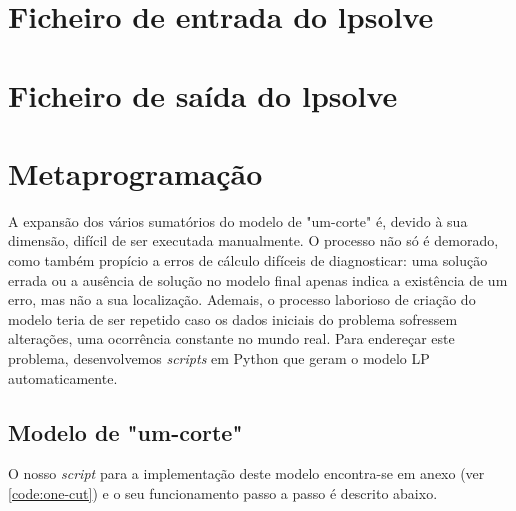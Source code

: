 \documentclass[12pt, a4paper, titlepage]{article}
\begin{document}
\section{Ficheiro de entrada do lpsolve}


\section{Ficheiro de saída do lpsolve}



\section{Metaprogramação}

A expansão dos vários sumatórios do modelo de "um-corte"{} é, devido à sua dimensão, difícil de ser
executada manualmente. O processo não só é demorado, como também propício a erros de cálculo
difíceis de diagnosticar: uma solução errada ou a ausência de solução no modelo final apenas indica
a existência de um erro, mas não a sua localização. Ademais, o processo laborioso de criação do
modelo teria de ser repetido caso os dados iniciais do problema sofressem alterações, uma ocorrência
constante no mundo real. Para endereçar este problema, desenvolvemos \emph{scripts} em Python que
geram o modelo LP automaticamente.

\subsection{Modelo de "um-corte"{}}

O nosso \emph{script} para a implementação deste modelo encontra-se em anexo (ver
\ref{code:one-cut}) e o seu funcionamento passo a passo é descrito abaixo.

\end{document}
